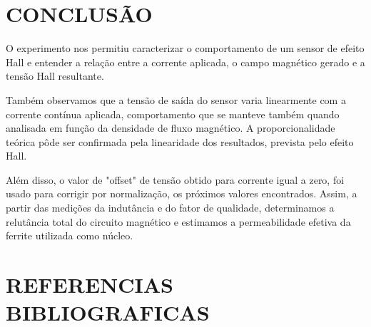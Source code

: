\documentclass[10pt,twocolumn,letterpaper]{article}
\begin{document}




\section{CONCLUSÃO}

\hspace{1cm} O experimento nos permitiu caracterizar o comportamento de um sensor de efeito Hall e entender a relação entre a corrente aplicada, o campo magnético gerado e a tensão Hall resultante.

\hspace{1cm} Também observamos que a tensão de saída do sensor varia linearmente com a corrente contínua aplicada, comportamento que se manteve também quando analisada em função da densidade de fluxo magnético. A proporcionalidade teórica pôde ser confirmada pela linearidade dos resultados, prevista pelo efeito Hall.

\hspace{1cm} Além disso, o valor de "offset" de tensão obtido para corrente igual a zero, foi usado para corrigir por normalização, os próximos valores encontrados. Assim, a partir das medições da indutância e do fator de qualidade, determinamos a relutância total do circuito magnético e estimamos a permeabilidade efetiva da ferrite utilizada como núcleo.

\section{REFERENCIAS BIBLIOGRAFICAS}
\end{document}
